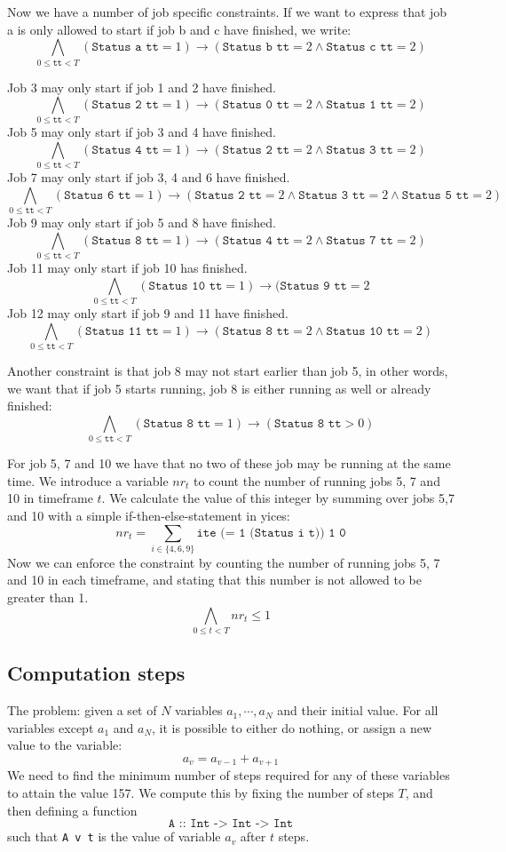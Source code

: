 \documentclass[12pt]{article}
\begin{document}
Now we have a number of job specific constraints. 
If we want to express that job a is only allowed to start if job b and c have finished, we write: 
\[ \bigwedge_{0 \le \texttt{tt} < T} (\texttt{Status a tt} = 1) \rightarrow (\texttt{Status b tt} = 2 \wedge \texttt{Status c tt} = 2) \]

Job 3 may only start if job 1 and 2 have finished.
\[ \bigwedge_{0 \le \texttt{tt} < T} (\texttt{Status 2 tt} = 1) \rightarrow (\texttt{Status 0 tt} = 2 \wedge \texttt{Status 1 tt} = 2) \]
Job 5 may only start if job 3 and 4 have finished.
\[ \bigwedge_{0 \le \texttt{tt} < T} (\texttt{Status 4 tt} = 1) \rightarrow (\texttt{Status 2 tt} = 2 \wedge \texttt{Status 3 tt} = 2) \]
Job 7 may only start if job 3, 4 and 6 have finished.
\[ \bigwedge_{0 \le \texttt{tt} < T} (\texttt{Status 6 tt} = 1) \rightarrow (\texttt{Status 2 tt} = 2 \wedge \texttt{Status 3 tt} = 2 \wedge \texttt{Status 5 tt} = 2) \]
Job 9 may only start if job 5 and 8 have finished.
\[ \bigwedge_{0 \le \texttt{tt} < T} (\texttt{Status 8 tt} = 1) \rightarrow (\texttt{Status 4 tt} = 2 \wedge \texttt{Status 7 tt} = 2) \]
Job 11 may only start if job 10 has finished.
\[ \bigwedge_{0 \le \texttt{tt} < T} (\texttt{Status 10 tt} = 1) \rightarrow (\texttt{Status 9 tt} = 2\]
Job 12 may only start if job 9 and 11 have finished.
\[ \bigwedge_{0 \le \texttt{tt} < T} (\texttt{Status 11 tt} = 1) \rightarrow (\texttt{Status 8 tt} = 2 \wedge \texttt{Status 10 tt} = 2) \]

Another constraint is that job 8 may not start earlier than job 5, in other words, we want that if job 5 starts running, job 8 is either running as well or already finished:
\[ \bigwedge_{0 \le \texttt{tt} < T} (\texttt{Status 8 tt} = 1) \rightarrow (\texttt{Status 8 tt} > 0) \]

For job 5, 7 and 10 we have that no two of these job may be running at the same time. 
We introduce a variable $nr_t$ to count the number of running jobs 5, 7 and 10 in timeframe $t$.
We calculate the value of this integer by summing over jobs 5,7 and 10 with a simple if-then-else-statement in yices: 
\[ nr_t = \sum_{i \in \{4,6,9\}} \texttt{ite (= 1 (Status i t)) 1 0} \]
Now we can enforce the constraint by counting the number of running jobs 5, 7 and 10 in each timeframe, 
and stating that this number is not allowed to be greater than 1. 
\[ \bigwedge_{0 \le t < T} nr_t \le 1\]

\subsection*{Computation steps}
The problem: given a set of $N$ variables $a_1, \cdots, a_N$ and their initial value.
For all variables except $a_1$ and $a_N$, it is possible to either do nothing, or assign a new value to the variable:
\[ a_v = a_{v-1} + a_{v+1} \]
We need to find the minimum number of steps required for any of these variables to attain the value 157.
We compute this by fixing the number of steps $T$, and then defining a function
\[\texttt{A :: Int -> Int -> Int}\]
such that \texttt{A v t} is the value of variable $a_v$ after $t$ steps.
\end{document}

